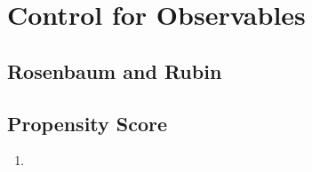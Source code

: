 \documentclass[12pt]{article}
\begin{document}
\section{Control for Observables} \label{control}
\subsection{Rosenbaum and Rubin} \label{RR}

\subsection{Propensity Score} \label{PS}
\begin{enumerate}
      \item 
\end{enumerate}
\end{document}
